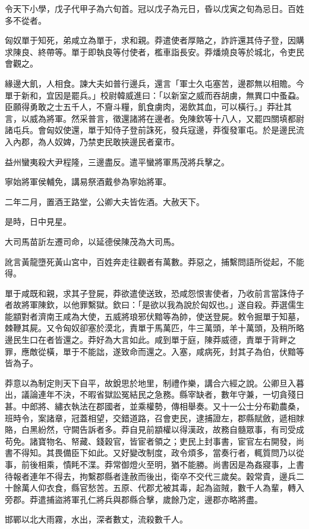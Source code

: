 \begin{pinyinscope}
令天下小學，戊子代甲子為六旬首。冠以戊子為元日，昏以戊寅之旬為忌日。百姓多不從者。

匈奴單于知死，弟咸立為單于，求和親。莽遣使者厚賂之，詐許還其侍子登，因購求陳良、終帶等。單于即執良等付使者，檻車詣長安。莽燔燒良等於城北，令吏民會觀之。

緣邊大飢，人相食。諫大夫如普行邊兵，還言「軍士久屯塞苦，邊郡無以相贍。今單于新和，宜因是罷兵。」校尉韓威進曰：「以新室之威而吞胡虜，無異口中蚤蝨。臣願得勇敢之士五千人，不齎斗糧，飢食虜肉，渴飲其血，可以橫行。」莽壯其言，以威為將軍。然采普言，徵還諸將在邊者。免陳欽等十八人，又罷四關填都尉諸屯兵。會匈奴使還，單于知侍子登前誅死，發兵寇邊，莽復發軍屯。於是邊民流入內郡，為人奴婢，乃禁吏民敢挾邊民者棄市。

益州蠻夷殺大尹程隆，三邊盡反。遣平蠻將軍馬茂將兵擊之。

寧始將軍侯輔免，講易祭酒戴參為寧始將軍。

二年二月，置酒王路堂，公卿大夫皆佐酒。大赦天下。

是時，日中見星。

大司馬苗訢左遷司命，以延德侯陳茂為大司馬。

訛言黃龍墮死黃山宮中，百姓奔走往觀者有萬數。莽惡之，捕繫問語所從起，不能得。

單于咸既和親，求其子登屍，莽欲遣使送致，恐咸怨恨害使者，乃收前言當誅侍子者故將軍陳欽，以他罪繫獄。欽曰：「是欲以我為說於匈奴也。」遂自殺。莽選儒生能顓對者濟南王咸為大使，五威將琅邪伏黯等為帥，使送登屍。敕令掘單于知墓，棘鞭其屍。又令匈奴卻塞於漠北，責單于馬萬匹，牛三萬頭，羊十萬頭，及稍所略邊民生口在者皆還之。莽好為大言如此。咸到單于庭，陳莽威德，責單于背畔之罪，應敵從橫，單于不能詘，遂致命而還之。入塞，咸病死，封其子為伯，伏黯等皆為子。

莽意以為制定則天下自平，故銳思於地里，制禮作樂，講合六經之說。公卿旦入暮出，議論連年不決，不暇省獄訟冤結民之急務。縣宰缺者，數年守兼，一切貪殘日甚。中郎將、繡衣執法在郡國者，並乘權勢，傳相舉奏。又十一公士分布勸農桑，班時令，案諸章，冠蓋相望，交錯道路，召會吏民，逮捕證左，郡縣賦斂，遞相賕賂，白黑紛然，守闕告訴者多。莽自見前顓權以得漢政，故務自髓眾事，有司受成苟免。諸寶物名、帑藏、錢穀官，皆宦者領之；吏民上封事書，宦官左右開發，尚書不得知。其畏備臣下如此。又好變改制度，政令煩多，當奏行者，輒質問乃以從事，前後相乘，憒眊不渫。莽常御燈火至明，猶不能勝。尚書因是為姦寢事，上書待報者連年不得去，拘繫郡縣者逢赦而後出，衛卒不交代三歲矣。穀常貴，邊兵二十餘萬人仰衣食，縣官愁苦。五原、代郡尤被其毒，起為盜賊，數千人為輩，轉入旁郡。莽遣捕盜將軍孔仁將兵與郡縣合擊，歲餘乃定，邊郡亦略將盡。

邯鄲以北大雨霧，水出，深者數丈，流殺數千人。


\end{pinyinscope}
